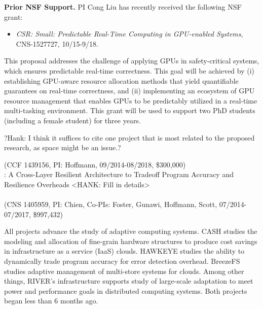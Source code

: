 \vspace{3mm} \noindent \textbf{Prior NSF Support.} PI Cong Liu  has recently received the following NSF grant:

\begin{itemize}
\item \textit{CSR: Small: Predictable Real-Time Computing in GPU-enabled Systems}, CNS-1527727, 10/15-9/18.
\end{itemize}

This proposal addresses the challenge of applying GPUs in safety-critical systems, which ensures predictable real-time correctness. This goal will be achieved by (i) establishing GPU-aware resource allocation methods that yield quantifiable guarantees on real-time correctness, and (ii) implementing an ecosystem of GPU resource management that enables GPUs to be predictably utilized in a real-time multi-tasking environment. This grant will be used to support two PhD students (including a female student) for three years. 

?Hank: I think it suffices to cite one project that is most related to the proposed research, as space might be an issue.?

\vspace{0.05cm}

 (CCF 1439156, PI: Hoffmann, 09/2014-08/2018, \$300,000)\\
: A Cross-Layer Resilient Architecture to Tradeoff Program Accuracy and Resilience Overheads <HANK: Fill in details>\\
 \\
 (CNS 1405959, PI: Chien, Co-PIs: Foster, Gunawi, Hoffmann, Scott, 07/2014-07/2017, \$997,432) 

All projects advance the study of adaptive computing systems.  CASH
studies the modeling and allocation of fine-grain hardware structures
to produce cost savings in infrastructure as a service (IaaS) clouds.
HAWKEYE studies the ability to dynamically trade program accuracy for
error detection overhead.  BreezeFS studies adaptive management of
multi-store systems for clouds.  Among other things, RIVER's
infrastructure supports study of large-scale adaptation to meet power
and performance goals in distributed computing systems.  Both projects
began less than 6 months ago.

